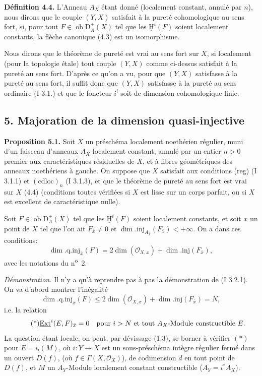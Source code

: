 \documentclass[11pt]{article}
\providecommand{\uH}{\underline{\mathrm H}}
\DeclareMathOperator{\Ext}{Ext}
\newcommand{\D}{\mathrm{D}}
\newcommand{\ob}{\operatorname{ob}}
\providecommand{\ob}{\operatorname{ob}}
\begin{document}
\textbf{Définition 4.4.} L'Anneau $A_X$ étant donné (localement constant, annulé par $n$), nous dirons que le couple $(Y,X)$ satisfait à la pureté cohomologique au sens fort, si, pour tout $F\in\ob\D_A^+(X)$ tel que les $\uH^i(F)$ soient localement constants, la flèche canonique (4.3) est un isomorphisme.

Nous dirons que le théorème de pureté est vrai au sens fort sur $X$, si localement (pour la topologie étale) tout couple $(Y,X)$ comme ci-dessus satisfait à la pureté au sens fort. D'après ce qu'on a vu, pour que $(Y,X)$ satisfasse à la pureté au sens fort, il suffit donc que $(Y,X)$ satisfasse à la pureté au sens ordinaire (I 3.1.) et que le foncteur $i^!$ soit de dimension cohomologique finie.

\subsection*{5. Majoration de la dimension quasi-injective}

\textbf{Proposition 5.1.} Soit $X$ un préschéma localement noethérien régulier, muni d'un faisceau d'anneaux $A_X$ localement constant, annulé par un entier $n>0$ premier aux caractéristiques résiduelles de $X$, et à fibres géométriques des anneaux noethériens à gauche. On suppose que $X$ satisfait aux conditions (reg) (I 3.1.1) et $(\mathrm{cdloc})_n$ (I 3.1.3), et que le théorème de pureté au sens fort est vrai sur $X$ (4.4) (conditions toutes vérifiées si $X$ est lisse sur un corps parfait, ou si $X$ est excellent de caractéristique nulle).

Soit $F\in\ob\D_A^+(X)$ tel que les $\uH^i(F)$ soient localement constants, et soit $x$ un point de $X$ tel que l'on ait $F_{\bar{x}}\neq0$ et $\dim.\mathrm{inj}_{A_{\bar{x}}}(F_{\bar{x}})<+\infty$. On a dans ces conditions:
\[
        \dim.\mathrm{q.inj}_{\bar{x}}(F)=2\dim(\mathcal{O}_{X,x})+\dim.\mathrm{inj}(F_{\bar{x}}),
\]
avec les notations du n\textsuperscript{o}~2.

\emph{Démonstration.} Il n'y a qu'à reprendre pas à pas la démonstration de (I 3.2.1). On va d'abord montrer l'inégalité
\[
        \dim.\mathrm{q.inj}_{\bar{x}}(F)\leq 2\dim(\mathcal{O}_{X,x})+\dim.\mathrm{inj}(F_{\bar{x}})=N,
\]
i.e. la relation
\begin{equation}\tag{*}
        \underline{\Ext}^{i}(E,F)_{\bar{x}}=0\quad\hbox{pour } i>N\hbox{ et tout }A_X\hbox{-Module constructible }E.
\end{equation}
La question étant locale, on peut, par dévissage (1.3), se borner à vérifier $(*)$ pour $E=i_!(M)$, où $i:Y\to X$ est un sous-préschéma intègre régulier fermé dans un ouvert $D(f)$, (où $f\in\Gamma(X,\mathcal{O}_X)$), de codimension $d$ en tout point de $D(f)$, et $M$ un $A_Y$-Module localement constant constructible ($A_Y=i^*A_X$).
\end{document}
